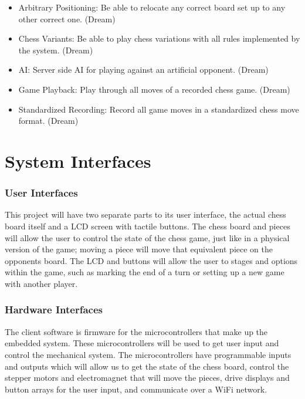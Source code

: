 \documentclass{article}
\begin{document}
\begin{itemize}

	\item Arbitrary Positioning: Be able to relocate any correct board set up to any other correct one. (Dream)
	\item Chess Variants: Be able to play chess variations with all rules implemented by the system. (Dream)
	\item AI: Server side AI for playing against an artificial opponent. (Dream)
	\item Game Playback: Play through all moves of a recorded chess game. (Dream)
	\item Standardized Recording: Record all game moves in a standardized chess move format. (Dream)

\end{itemize}

\section*{System Interfaces}

\subsubsection*{User Interfaces}
\indent

This project will have two separate parts to its user interface, the actual chess board itself and a LCD screen with tactile buttons. The chess board and pieces will allow the user to control the state of the chess game, just like in a physical version of the game; moving a piece will move that equivalent piece on the opponents board. The LCD and buttons will allow the user to stages and options within the game, such as marking the end of a turn or setting up a new game with another player.

\subsubsection*{Hardware Interfaces}
\indent

The client software is firmware for the microcontrollers that make up the embedded system. These microcontrollers will be used to get user input and control the mechanical system. The microcontrollers have programmable inputs and outputs which will allow us to get the state of the chess board, control the stepper motors and electromagnet that will move the pieces, drive displays and button arrays for the user input, and communicate over a WiFi network.
\end{document}

